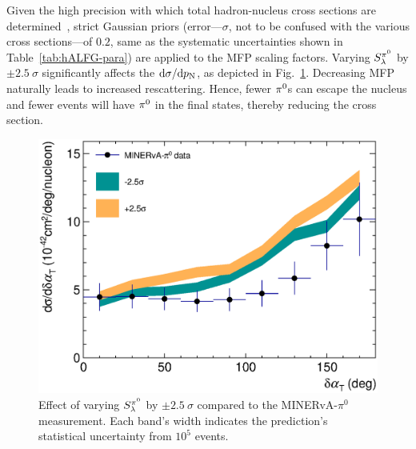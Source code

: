 \begin{enumerate}
    Given the high precision with which total hadron-nucleus cross sections are determined~\cite{LADS:1999dyv,Navon:1983xj,Carroll:1976hj,Clough:1974qt,BAUHOFF1986429}, strict Gaussian priors (error---$\sigma$, not to be confused with the various cross sections---of $0.2$, same as the systematic uncertainties shown in Table~\ref{tab:hALFG-para}) are applied to the MFP scaling factors. 
    Varying $S_\lambda^{\pi^{0}}$ by $\pm2.5~\sigma$ significantly affects the \minpiz $\textrm{d}\sigma/\textrm{d}p_\textrm{N}$, as depicted in Fig.~\ref{fig:minpiz-pn-pi0mfp}. Decreasing MFP naturally leads to increased rescattering. Hence, fewer $\pi^0$s can escape the nucleus and fewer events will have $\pi^0$ in the final states, thereby reducing the cross section. 

    \begin{figure}[!htb]
        \centering
        \includegraphics[width=\sgfigwid\textwidth]{figures/tuning/minerva_pi0_dalphat_FSI_pi0mfp.eps}
        \caption{Effect of varying $S_\lambda^{\pi^{0}}$ by $\pm2.5~\sigma$ compared to the MINERvA-$\pi^0$ measurement. Each band's width indicates the \genie prediction's statistical uncertainty from $10^5$ events.}
        \label{fig:minpiz-pn-pi0mfp}
    \end{figure}



\end{enumerate}
